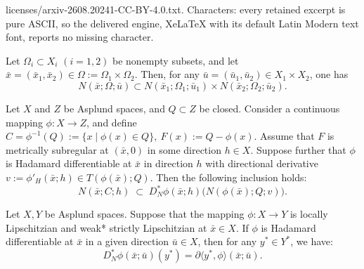 \documentclass[10pt,a4paper]{amsart}
\begin{document}
licenses/arxiv-2608.20241-CC-BY-4.0.txt. Characters: every retained excerpt is pure ASCII, so the delivered engine, XeLaTeX with its default Latin Modern text font, reports no missing character.
\begin{proposition}\label{prop of directional normal cones of product of separated sets}
Let $\Omega_i\subset X_i$ $(i=1,2)$ be nonempty subsets, and let $\bar x=(\bar x_1,\bar x_2)\in \Omega:=\Omega_1\times \Omega_2$. 
Then, for any $\bar u=(\bar u_1,\bar u_2)\in X_1\times X_2$, one has
\begin{equation}
    N(\bar x;\Omega;\bar u)
    \subset 
    N(\bar x_1;\Omega_1;\bar u_1)\times N(\bar x_2;\Omega_2;\bar u_2).
\end{equation}
\end{proposition}

\begin{theorem}\label{thm: directional normal cones of preimage sets} 
Let \( X \) and \( Z \) be Asplund spaces, and \( Q \subset Z \) be closed.  
Consider a continuous mapping \( \phi : X \to Z \), and define
$C = \phi^{-1}(Q):= \{x\mid \phi(x)\in Q\}, ~F(x) := Q - \phi(x)$. 
Assume that \( F \) is metrically subregular at \( (\bar{x}, 0) \) in some direction \( h \in X \).  
Suppose further that \( \phi \) is Hadamard differentiable at \(\bar{x}\) in direction \( h \) with directional derivative $v := \phi'_H(\bar{x}; h)\in T(\phi(\bar x);Q)$. Then the following inclusion holds:
\begin{equation}\label{eq:dir_normal_preimage}
    N(\bar{x}; C; h) \;\subset\; D^*_N \phi(\bar{x}; h) \big( N(\phi(\bar{x}); Q; v) \big).
\end{equation}
\end{theorem}

\begin{theorem} \label{thm:scalarization}
Let $X,Y$ be Asplund spaces. Suppose that the mapping $\phi: X \to Y$ is locally Lipschitzian and weak* strictly Lipschitzian at $\bar{x} \in X$. If $\phi$ is Hadamard differentiable at $\bar{x}$ in a given direction $\bar{u} \in X$, then for any $y^* \in Y^*$, we have: 
\begin{equation} \label{eq:scalarization_formula}
    D_N^* \phi(\bar{x}; \bar{u})(y^*) = \partial \langle y^*, \phi \rangle (\bar{x}; \bar{u}).
\end{equation}
\end{theorem}
\end{document}

